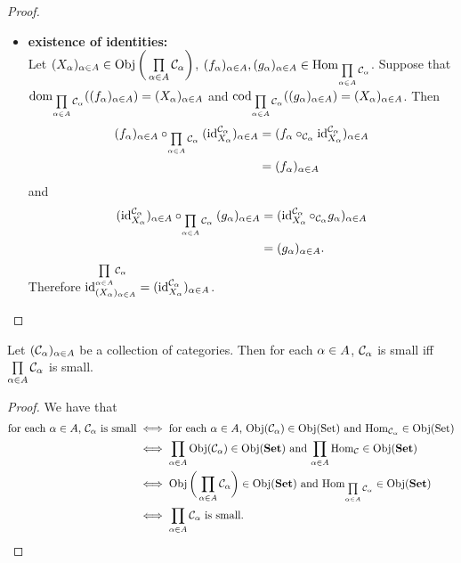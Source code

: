 \documentclass{book}
\begin{document}
\begin{proof}
\begin{itemize}
\begin{align*}
				& = (f^{34}_{\al})_{\al \in A} \circ_{\prod\limits_{\al \in A} \MC_{\al}} [(f^{23}_{\al})_{\al \in A} \circ_{\prod\limits_{\al \in A} \MC_{\al}} (f^{34}_{\al})_{\al \in A}].
			\end{align*}  
			Thus composition is associative. \\
			\item \textbf{existence of identities: } \\
			Let $(X_{\alpha})_{\alpha \in A} \in \operatorname{Obj} \bigg(\prod\limits_{\alpha \in A} \mathcal{C}_{\alpha} \bigg)$, $(f_{\alpha})_{\alpha \in A}, (g_{\alpha})_{\alpha \in A} \in \operatorname{Hom}_{\prod\limits_{\alpha \in A} \mathcal{C}_{\alpha}}$. Suppose that $\operatorname{dom}_{\prod\limits_{\alpha \in A} \mathcal{C}_{\alpha}}((f_{\alpha})_{\alpha \in A}) = (X_{\alpha})_{\alpha \in A}$ and $\operatorname{cod}_{\prod\limits_{\alpha \in A} \mathcal{C}_{\alpha}}((g_{\alpha})_{\alpha \in A}) = (X_{\alpha})_{\alpha \in A}$. Then 
			\begin{align*}
				(f_{\alpha})_{\alpha \in A} \circ_{\prod\limits_{\alpha \in A} \mathcal{C}_{\alpha}} (\operatorname{id}_{X_{\alpha}}^{\mathcal{C}_{\alpha}})_{\alpha \in A}
				& = (f_{\alpha} \circ_{\mathcal{C}_{\alpha}} \operatorname{id}_{X_{\alpha}}^{\mathcal{C}_{\alpha}})_{\alpha \in A} \\
				& = (f_{\alpha})_{\alpha \in A} 
			\end{align*}
			and
			\begin{align*}
				(\operatorname{id}_{X_{\alpha}}^{\mathcal{C}_{\alpha}})_{\alpha \in A} \circ_{\prod\limits_{\alpha \in A} \mathcal{C}_{\alpha}} (g_{\alpha})_{\alpha \in A}
				& = (\operatorname{id}_{X_{\alpha}}^{\mathcal{C}_{\alpha}} \circ_{\mathcal{C}_{\alpha}} g_{\alpha})_{\alpha \in A} \\
				& = (g_{\alpha})_{\alpha \in A}.
			\end{align*}
			Therefore $\operatorname{id}_{(X_{\alpha})_{\alpha \in A}}^{\prod\limits_{\alpha \in A} \mathcal{C}_{\alpha}} = (\operatorname{id}_{X_{\alpha}}^{\mathcal{C}_{\alpha}})_{\alpha \in A}$.
		\end{itemize}
	\end{proof}
	
	\begin{ex} 
		Let $(\mathcal{C}_{\alpha})_{\alpha \in A}$ be a collection of categories. Then for each $\alpha \in A$, $\mathcal{C}_{\alpha}$ is small iff $\prod\limits_{\alpha \in A} \mathcal{C}_{\alpha}$ is small.
	\end{ex}
	
	\begin{proof}
		We have that 
		\begin{align*}
			\text{for each $\alpha \in A$, $\mathcal{C}_{\alpha}$ is small}
			& \iff \text{for each $\alpha \in A$, $\operatorname{Obj}(\mathcal{C}_{\alpha}) \in \operatorname{Obj}(\text{Set})$ and $\operatorname{Hom}_{\mathcal{C}_{\alpha}} \in \operatorname{Obj}(\text{Set})$} \\
			& \iff \text{$ \prod\limits_{\alpha \in A} \operatorname{Obj}(\mathcal{C}_{\alpha}) \in \operatorname{Obj}(\text{\textbf{Set}})$ and $\prod\limits_{\alpha \in A} \operatorname{Hom}_{\mathcal{C}} \in \operatorname{Obj}(\text{\textbf{Set}})$} \\
			& \iff \text{$ \operatorname{Obj} \bigg(\prod\limits_{\alpha \in A} \mathcal{C}_{\alpha} \bigg) \in \operatorname{Obj}(\text{\textbf{Set}})$ and $\operatorname{Hom}_{\prod\limits_{\alpha \in A} \mathcal{C}_{\alpha}} \in \operatorname{Obj}(\text{\textbf{Set}})$} \\
			& \iff \text{$ \prod\limits_{\alpha \in A} \mathcal{C}_{\alpha}$ is small}.
		\end{align*}
	\end{proof}
	
\end{document}
